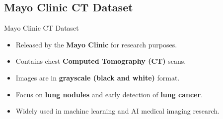 \subsection{Mayo Clinic CT Dataset}

\begin{frame}{Mayo Clinic CT Dataset}
  \begin{itemize}
    \item Released by the \textbf{Mayo Clinic} for research purposes.
    \item Contains chest \textbf{Computed Tomography (CT)} scans.
    \item Images are in \textbf{grayscale (black and white)} format.
    \item Focus on \textbf{lung nodules} and early detection of \textbf{lung cancer}.
    \item Widely used in machine learning and AI medical imaging research.
  \end{itemize}
\end{frame}
